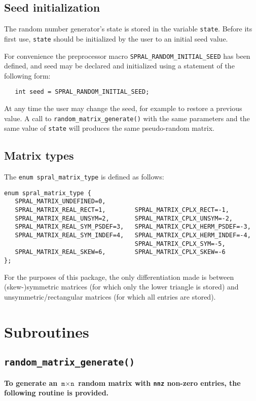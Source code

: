\subsection{Seed initialization}
\label{random_matrix: seed initialization}
The random number generator's state is stored in the variable {\tt state}.
Before its first use, {\tt state} should be initialized by the user to an
initial seed value.

For convenience the preprocessor macro \texttt{SPRAL\_RANDOM\_INITIAL\_SEED} has
been defined, and seed may be declared and initialized using a statement of the
following form:
\begin{verbatim}
   int seed = SPRAL_RANDOM_INITIAL_SEED;
\end{verbatim}

At any time the user may change the seed, for example to restore a previous
value. A call to \texttt{random\_matrix\_generate()} with the same parameters
and the same value of \texttt{state} will produces the same pseudo-random
matrix.

\subsection{Matrix types}
\label{random_matrix: matrix types}
The \texttt{enum spral\_matrix\_type} is defined as follows:
\begin{verbatim}
enum spral_matrix_type {
   SPRAL_MATRIX_UNDEFINED=0,
   SPRAL_MATRIX_REAL_RECT=1,        SPRAL_MATRIX_CPLX_RECT=-1,
   SPRAL_MATRIX_REAL_UNSYM=2,       SPRAL_MATRIX_CPLX_UNSYM=-2,
   SPRAL_MATRIX_REAL_SYM_PSDEF=3,   SPRAL_MATRIX_CPLX_HERM_PSDEF=-3,
   SPRAL_MATRIX_REAL_SYM_INDEF=4,   SPRAL_MATRIX_CPLX_HERM_INDEF=-4,
                                    SPRAL_MATRIX_CPLX_SYM=-5,
   SPRAL_MATRIX_REAL_SKEW=6,        SPRAL_MATRIX_CPLX_SKEW=-6
};
\end{verbatim}

For the purposes of this package, the only differentiation made is between
(skew-)symmetric matrices (for which only the lower triangle is stored) and
unsymmetric/rectangular matrices (for which all entries are stored).


\section{Subroutines}

\subsection{\texttt{random\_matrix\_generate()}}
\textbf{
   To generate an $\texttt{m}\times \texttt{n}$ random matrix with \texttt{nnz}
non-zero entries, the following routine is provided.
}

